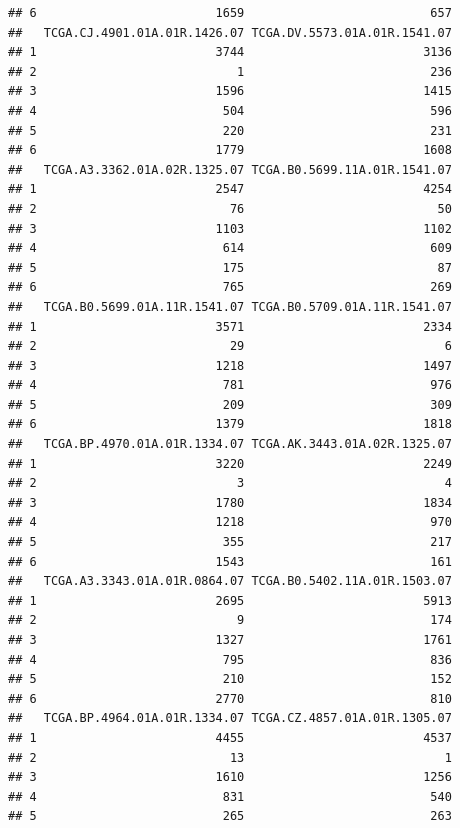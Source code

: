 \documentclass[
]{article}
\begin{document}
\begin{verbatim}
## 6                         1659                          657
##   TCGA.CJ.4901.01A.01R.1426.07 TCGA.DV.5573.01A.01R.1541.07
## 1                         3744                         3136
## 2                            1                          236
## 3                         1596                         1415
## 4                          504                          596
## 5                          220                          231
## 6                         1779                         1608
##   TCGA.A3.3362.01A.02R.1325.07 TCGA.B0.5699.11A.01R.1541.07
## 1                         2547                         4254
## 2                           76                           50
## 3                         1103                         1102
## 4                          614                          609
## 5                          175                           87
## 6                          765                          269
##   TCGA.B0.5699.01A.11R.1541.07 TCGA.B0.5709.01A.11R.1541.07
## 1                         3571                         2334
## 2                           29                            6
## 3                         1218                         1497
## 4                          781                          976
## 5                          209                          309
## 6                         1379                         1818
##   TCGA.BP.4970.01A.01R.1334.07 TCGA.AK.3443.01A.02R.1325.07
## 1                         3220                         2249
## 2                            3                            4
## 3                         1780                         1834
## 4                         1218                          970
## 5                          355                          217
## 6                         1543                          161
##   TCGA.A3.3343.01A.01R.0864.07 TCGA.B0.5402.11A.01R.1503.07
## 1                         2695                         5913
## 2                            9                          174
## 3                         1327                         1761
## 4                          795                          836
## 5                          210                          152
## 6                         2770                          810
##   TCGA.BP.4964.01A.01R.1334.07 TCGA.CZ.4857.01A.01R.1305.07
## 1                         4455                         4537
## 2                           13                            1
## 3                         1610                         1256
## 4                          831                          540
## 5                          265                          263

\end{verbatim}
\end{document}
